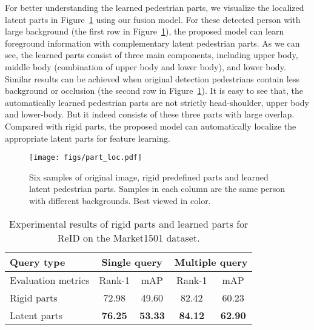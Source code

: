 \documentclass[10pt,twocolumn,letterpaper]{article}
\begin{document}
For better understanding the learned pedestrian parts, we visualize the localized latent parts in Figure~\ref{fig:visualizationloc} using our fusion model.
For these detected person with large background (the first row in Figure~\ref{fig:visualizationloc}), the proposed model can learn foreground information with complementary latent pedestrian parts.
As we can see, the learned parts consist of three main components, including upper body, middle body (combination of upper body and lower body), and lower body.
Similar results can be achieved when original detection pedestrians contain less background or occlusion (the second row in Figure~\ref{fig:visualizationloc}).
It is easy to see that, the automatically learned pedestrian parts are not strictly head-shoulder, upper body and lower-body.
But it indeed consists of these three parts with large overlap.
Compared with rigid parts, the proposed model can automatically localize the appropriate latent parts for feature learning.

\begin{figure}[tbp]
  \centering
  \texttt{[image: figs/part\_loc.pdf]}
  \caption{Six samples of original image, rigid predefined parts and learned latent pedestrian parts. Samples in each column are the same person with different backgrounds. Best viewed in color.
  }
  \label{fig:visualizationloc}
  \vspace{-1em}
\end{figure}

\begin{table}[!htbp]
  \begin{center}
    \scriptsize
    \begin{tabular}{|l|cc|cc|}
    \hline
    Query type & \multicolumn{2}{c|}{Single query} & \multicolumn{2}{c|}{Multiple query} \\
    \hline
    Evaluation metrics & Rank-1    & mAP   & Rank-1    & mAP \\
    \hline
    \hline
    Rigid parts & 72.98  & 49.60  & 82.42  & 60.23  \\
    \hline
    Latent parts & \textbf{76.25}  & \textbf{53.33}  & \textbf{84.12}  & \textbf{62.90}   \\
    \hline
    \end{tabular}\end{center}
  \vspace{-0.5em}
  \caption{Experimental results of rigid parts and learned parts for ReID on the Market1501 dataset.}
  \vspace{-0.0em}
  \label{tab:partmarket}\end{table}
\end{document}

